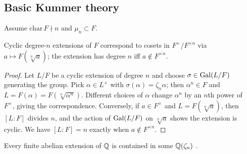 \subsection{Basic Kummer theory}
Assume $\mathrm{char}\,F\nmid n$ and $\mu_n\subset F$.
\begin{theorem}[Kummer]
Cyclic degree-$n$ extensions of $F$ correspond to cosets in $F^\times/F^{\times n}$ via $a\mapsto F(\sqrt[n]{a})$; the extension has degree $n$ iff $a\notin F^{\times n}$.
\end{theorem}
\begin{proof}
Let $L/F$ be a cyclic extension of degree $n$ and choose
$\sigma\in\operatorname{Gal}(L/F)$ generating the group.
Pick $\alpha\in L^\times$ with
$\sigma(\alpha)=\zeta_n\alpha$; then $\alpha^n\in F$ and
$L=F(\alpha)=F(\sqrt[n]{\alpha^n})$.
Different choices of $\alpha$ change $\alpha^n$ by an $n$th power of
$F^\times$, giving the correspondence.
Conversely, if $a\in F^\times$ and $L=F(\sqrt[n]{a})$, then
$[L:F]$ divides $n$, and the action of $\operatorname{Gal}(L/F)$ on $\sqrt[n]{a}$ shows
the extension is cyclic.
We have $[L:F]=n$ exactly when $a\notin F^{\times n}$.
\end{proof}
\begin{remark}
Every finite abelian extension of $\mathbb{Q}$ is contained in some $\mathbb{Q}(\zeta_n)$ \cite{Neukirch}.
\end{remark}
